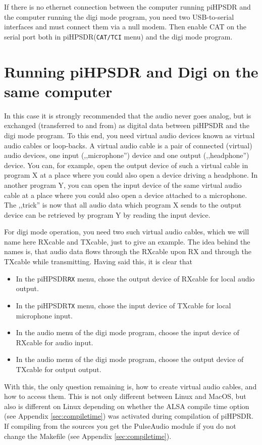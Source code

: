 \documentclass[12pt]{book}
\def\bltt#1{\texttt{\color{blue}#1}}
\def\pH{pi\-HPSDR\xspace}
\begin{document}
If there is no ethernet connection between the computer running \pH and the computer
running the digi mode program, you need two USB-to-serial interfaces and must connect them
via a null modem. Then enable CAT on the serial port both in \pH (\bltt{CAT/TCI} menu) and the
digi mode program.

\section[\pH and Digi on same computer]{Running \pH and Digi on the same computer}
In this case it is strongly recommended that the audio never goes analog, but is
exchanged (transferred to and from)
as digital data between \pH and the digi mode program. To this end, you need
virtual audio devices known as {\color{red} virtual audio cables} or {\color{red}
loop-backs}. A virtual audio cable is a pair of connected (virtual) audio devices,
one input (,,microphone'') device and one output (,,headphone'') device. You can,
for example, open the output device of such a virtual cable in program X at a place
where you could also open a device driving a headphone. In another program Y, you can
open the input device of the same virtual audio cable at a place where you could also
open a device attached to a microphone. The ,,trick'' is now that all audio data which
program X sends to the output device can be retrieved by program Y by reading the input device.



For digi mode operation, you need two such virtual audio cables, which we will name here
RXcable and TXcable, just to give an example. The idea behind the names is, that audio data
flows through the RXcable upon RX and through the TXcable while transmitting. Having said this,
it is clear that

\begin{itemize}
\item{In the \pH \bltt{RX} menu, chose the output device of RXcable for local audio output.}
\item{In the \pH \bltt{TX} menu, chose the input device of TXcable for local microphone input.}
\item{In the audio menu of the digi mode program, choose the input device of RXcable for audio input.}
\item{In the audio menu of the digi mode program, choose the output device of TXcable for output output.}
\end{itemize}

With this, the only question remaining is, how to create virtual audio cables, and how to access them.
This is not only different between Linux and MacOS, but also is different on Linux depending on
whether the ALSA compile time option (see Appendix \ref{sec:compiletime}) was activated during
compilation of \pH. If compiling from the sources you get the PulseAudio module if you
do not change the Makefile (see Appendix \ref{sec:compiletime}).
\end{document}
